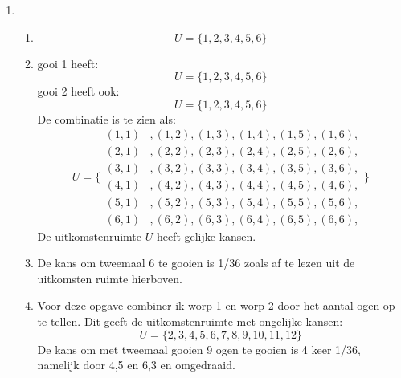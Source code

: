 \documentclass[pdftex,12pt,a4paper]{article}
\begin{document}

\begin{enumerate}
    \item
        \begin{enumerate}
            \item
            	$$U=\{1,2,3,4,5,6\}$$
            \item
            	gooi 1 heeft:
            		$$U=\{1,2,3,4,5,6\}$$
            	gooi 2 heeft ook:
            		$$U=\{1,2,3,4,5,6\}$$
            	De combinatie is te zien als:
            	\begin{equation}
            		U=\{\begin{split}
            		      (1,1)&, (1,2), (1,3), (1,4), (1,5), (1,6), \\
                          (2,1)&, (2,2), (2,3), (2,4), (2,5), (2,6), \\
                          (3,1)&, (3,2), (3,3), (3,4), (3,5), (3,6), \\
                          (4,1)&, (4,2), (4,3), (4,4), (4,5), (4,6), \\
                          (5,1)&, (5,2), (5,3), (5,4), (5,5), (5,6), \\
                          (6,1)&, (6,2), (6,3), (6,4), (6,5), (6,6),
            			\end{split}\}
            	\end{equation}
            	De uitkomstenruimte $U$ heeft gelijke kansen.
            \item
            	De kans om tweemaal 6 te gooien is 1/36 zoals af te lezen uit de 
            	uitkomsten ruimte hierboven.
            \item
            	Voor deze opgave combiner ik worp 1 en worp 2 door het aantal
            	ogen op te tellen. Dit geeft de uitkomstenruimte met ongelijke
            	kansen:
            		$$U=\{2,3,4,5,6,7,8,9,10,11,12\}$$
            	De kans om met tweemaal gooien 9 ogen te gooien is 4 keer 1/36,
          		namelijk door 4,5 en 6,3 en omgedraaid.
          		


\end{enumerate}
\end{enumerate}
\end{document}
